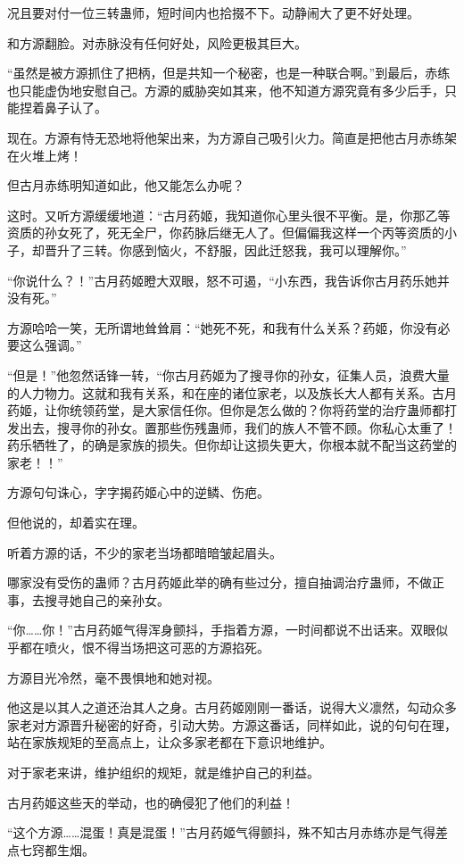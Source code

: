\begin{this_body}
况且要对付一位三转蛊师，短时间内也拾掇不下。动静闹大了更不好处理。

和方源翻脸。对赤脉没有任何好处，风险更极其巨大。

“虽然是被方源抓住了把柄，但是共知一个秘密，也是一种联合啊。”到最后，赤练也只能虚伪地安慰自己。方源的威胁突如其来，他不知道方源究竟有多少后手，只能捏着鼻子认了。

现在。方源有恃无恐地将他架出来，为方源自己吸引火力。简直是把他古月赤练架在火堆上烤！

但古月赤练明知道如此，他又能怎么办呢？

这时。又听方源缓缓地道：“古月药姬，我知道你心里头很不平衡。是，你那乙等资质的孙女死了，死无全尸，你药脉后继无人了。但偏偏我这样一个丙等资质的小子，却晋升了三转。你感到恼火，不舒服，因此迁怒我，我可以理解你。”

“你说什么？！”古月药姬瞪大双眼，怒不可遏，“小东西，我告诉你古月药乐她并没有死。”

方源哈哈一笑，无所谓地耸耸肩：“她死不死，和我有什么关系？药姬，你没有必要这么强调。”

“但是！”他忽然话锋一转，“你古月药姬为了搜寻你的孙女，征集人员，浪费大量的人力物力。这就和我有关系，和在座的诸位家老，以及族长大人都有关系。古月药姬，让你统领药堂，是大家信任你。但你是怎么做的？你将药堂的治疗蛊师都打发出去，搜寻你的孙女。置那些伤残蛊师，我们的族人不管不顾。你私心太重了！药乐牺牲了，的确是家族的损失。但你却让这损失更大，你根本就不配当这药堂的家老！！”

方源句句诛心，字字揭药姬心中的逆鳞、伤疤。

但他说的，却着实在理。

听着方源的话，不少的家老当场都暗暗皱起眉头。

哪家没有受伤的蛊师？古月药姬此举的确有些过分，擅自抽调治疗蛊师，不做正事，去搜寻她自己的亲孙女。

“你……你！”古月药姬气得浑身颤抖，手指着方源，一时间都说不出话来。双眼似乎都在喷火，恨不得当场把这可恶的方源掐死。

方源目光冷然，毫不畏惧地和她对视。

他这是以其人之道还治其人之身。古月药姬刚刚一番话，说得大义凛然，勾动众多家老对方源晋升秘密的好奇，引动大势。方源这番话，同样如此，说的句句在理，站在家族规矩的至高点上，让众多家老都在下意识地维护。

对于家老来讲，维护组织的规矩，就是维护自己的利益。

古月药姬这些天的举动，也的确侵犯了他们的利益！

“这个方源……混蛋！真是混蛋！”古月药姬气得颤抖，殊不知古月赤练亦是气得差点七窍都生烟。


\end{this_body}
